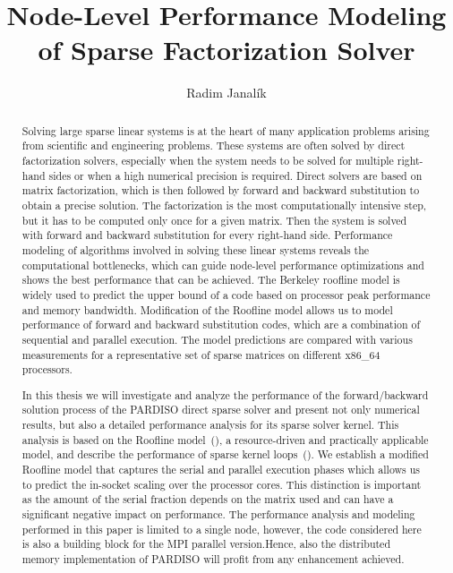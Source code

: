 \documentclass[]{usiinfthesis}
\title{Node-Level Performance Modeling \\of Sparse Factorization Solver} %
\author{Radim Janal\'ik} %
\begin{document}
\maketitle %

\frontmatter %

\begin{abstract}
Solving large sparse linear systems is at the heart of many application problems arising from scientific and engineering problems. These systems are often solved by direct factorization solvers, especially when the system needs to be solved for multiple right-hand sides or when a high numerical precision is required.
Direct solvers are based on matrix factorization, which is then followed by forward and backward substitution to obtain a precise solution. The factorization is the most computationally intensive step, but it has to be computed only once for a given matrix. Then the system is solved with forward and backward substitution for every right-hand side.
Performance modeling of algorithms involved in solving these linear systems reveals the computational bottlenecks, which can guide node-level performance optimizations and shows the best performance that can be achieved.
The Berkeley roofline model is widely used to predict the upper bound of a code based on processor peak performance and memory bandwidth. Modification of the Roofline model allows us to model performance of forward and backward substitution codes, which are a combination of sequential and parallel execution. The model predictions are compared with various measurements for a representative set of sparse matrices on different x86\_64 processors.

   {\color{red} In this thesis we will investigate and analyze the performance of the forward/backward solution process of the PARDISO direct sparse solver and present not only numerical
results, but also a detailed performance analysis for its sparse solver kernel. This analysis is based on the Roofline model~(\cite{williams-2009}), a resource-driven and practically applicable model, and describe the performance of sparse kernel loops~(\cite{Gropp99,Williams:EECS-2008-164,KHWPAF14}). We establish a modified Roofline model that captures the serial and parallel execution phases which allows us to predict the in-socket scaling over the processor cores. This distinction is important as the amount of the serial fraction depends on the matrix used and can have a significant negative impact on performance. The performance analysis and modeling performed in this paper is limited to a single node, however, the code considered here is also a building block for the
   MPI parallel version.Hence, also the distributed memory implementation of PARDISO will profit from any enhancement achieved.}
\end{abstract}
\end{document}
